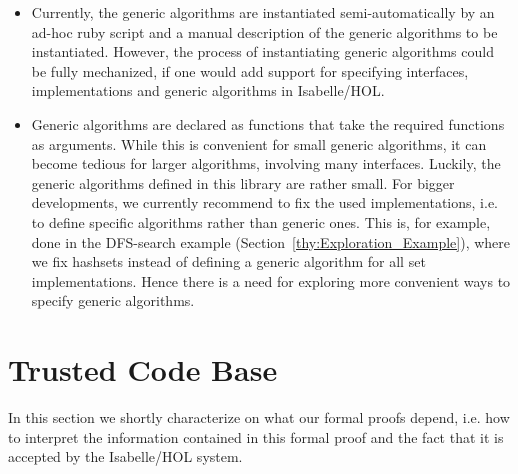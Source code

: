 \begin{itemize}
  \item Currently, the generic algorithms are instantiated semi-automatically by an ad-hoc ruby script and a
  manual description of the generic algorithms to be instantiated. However, the process of instantiating
  generic algorithms could be fully mechanized, if one would add support for specifying interfaces, 
  implementations and generic algorithms in Isabelle/HOL. 
  
  \item Generic algorithms are declared as functions that take the required functions as arguments.
  While this is convenient for small generic algorithms, it can become tedious for larger algorithms,
  involving many interfaces. 
  Luckily, the generic algorithms defined in this library are rather small. For bigger developments, we currently recommend to
  fix the used implementations, i.e. to define specific algorithms rather than generic ones. This is, for example, done in the 
  DFS-search example (Section~\ref{thy:Exploration_Example}), where we fix hashsets instead of defining a generic algorithm for
  all set implementations. Hence there is a need for exploring more convenient ways to specify generic algorithms.
  
\end{itemize}

\section {Trusted Code Base}
  In this section we shortly characterize on what our formal proofs depend, i.e. how to interpret the information contained in this formal proof and the fact that it
  is accepted by the Isabelle/HOL system.

